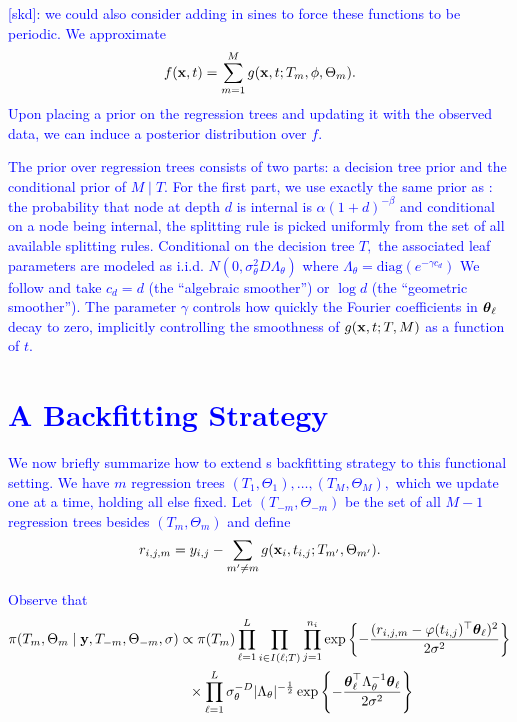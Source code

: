 \documentclass[12pt]{article}
\begin{document}
\textcolor{blue}{[skd]: we could also consider adding in sines to force these functions to be periodic. 
We approximate
$$
f(\mathbf{x}, t) = \sum_{m = 1}^{M}{g(\mathbf{x}, t; T_{m}, \phi, \Theta_{m})}.
$$
Upon placing a prior on the regression trees and updating it with the observed data, we can induce a posterior distribution over $f.$

The prior over regression trees consists of two parts: a decision tree prior and the conditional prior of $M \mid T.$
For the first part, we use exactly the same prior as \citet{Chipman2010}: the probability that node at depth $d$ is internal is $\alpha(1 + d)^{-\beta}$ and conditional on a node being internal, the splitting rule is picked uniformly from the set of all available splitting rules.
Conditional on the decision tree $T,$ the associated leaf parameters are modeled as i.i.d. $N(0, \sigma_{\theta}^{2}D\Lambda_{\theta})$ where $\Lambda_{\theta} = \text{diag}(e^{-\gamma c_{d}})$
We follow \citet{Lenk1999} and take $c_{d} = d$ (the ``algebraic smoother'') or $\log{d}$ (the ``geometric smoother'').
The parameter $\gamma$ controls how quickly the Fourier coefficients in $\boldsymbol{\theta}_{\ell}$ decay to zero, implicitly controlling the smoothness of $g(\mathbf{x}, t; T, M)$ as a function of $t.$


\section{A Backfitting Strategy}

We now briefly summarize how to extend \citet{Chipman2010}s backfitting strategy to this functional setting.
We have $m$ regression trees $(T_{1}, \Theta_{1}),\ldots, (T_{M}, \Theta_{M}),$ which we update one at a time, holding all else fixed.
Let $(T_{-m}, \Theta_{-m})$ be the set of all $M-1$ regression trees besides $(T_{m}, \Theta_{m})$ and define
$$
r_{i,j,m} = y_{i,j} - \sum_{m' \neq m}{g(\mathbf{x}_{i}, t_{i,j}; T_{m'}, \Theta_{m'})}.
$$

Observe that
\begin{align*}
\pi(T_{m}, \Theta_{m} \mid \mathbf{y}, T_{-m}, \Theta_{-m}, \sigma) &\propto \pi(T_{m})\prod_{\ell = 1}^{L}{\prod_{i \in I(\ell; T)}{\prod_{j = 1}^{n_{i}}{\exp\left\{-\frac{(r_{i,j,m} - \varphi(t_{i,j})^{\top}\boldsymbol{\theta}_{\ell})^{2}}{2\sigma^{2}}\right\}}}} \\
& ~ ~ \times \prod_{\ell = 1}^{L}{\sigma^{-D}_{\theta}\lvert\Lambda_{\theta}\rvert^{-\frac{1}{2}}\exp\left\{-\frac{\boldsymbol{\theta}_{\ell}^{\top}\Lambda^{-1}_{\theta}\boldsymbol{\theta}_{\ell}}{2\sigma^{2}}\right\}}
\end{align*}

}
\end{document}
